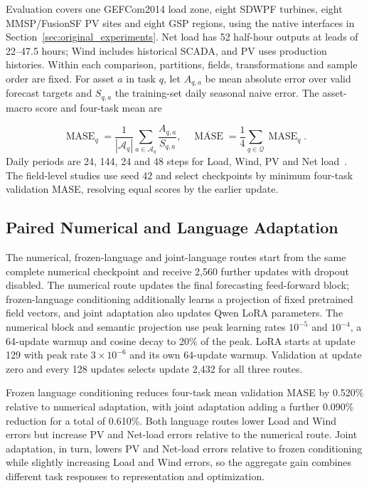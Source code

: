 \documentclass[journal]{IEEEtran}
\begin{document}
Evaluation covers one GEFCom2014 load zone, eight SDWPF turbines, eight MMSP/FusionSF PV sites and eight GSP regions, using the native interfaces in Section~\ref{sec:original_experiments}. Net load has 52 half-hour outputs at leads of 22--47.5 hours; Wind includes historical SCADA, and PV uses production histories. Within each comparison, partitions, fields, transformations and sample order are fixed. For asset $a$ in task $q$, let $A_{q,a}$ be mean absolute error over valid forecast targets and $S_{q,a}$ the training-set daily seasonal naive error. The asset-macro score and four-task mean are


\begin{equation}
\label{eq:language_study_mase}
\operatorname{MASE}_q=\frac{1}{|\mathcal A_q|}\sum_{a\in\mathcal A_q}\frac{A_{q,a}}{S_{q,a}},
\quad
\overline{\operatorname{MASE}}=\frac14\sum_{q\in\mathcal Q}\operatorname{MASE}_q.
\end{equation}
Daily periods are 24, 144, 24 and 48 steps for Load, Wind, PV and Net load~\cite{hyndman2006accuracy}. The field-level studies use seed 42 and select checkpoints by minimum four-task validation MASE, resolving equal scores by the earlier update.

\subsection{Paired Numerical and Language Adaptation}

The numerical, frozen-language and joint-language routes start from the same complete numerical checkpoint and receive 2,560 further updates with dropout disabled. The numerical route updates the final forecasting feed-forward block; frozen-language conditioning additionally learns a projection of fixed pretrained field vectors, and joint adaptation also updates Qwen LoRA parameters. The numerical block and semantic projection use peak learning rates $10^{-5}$ and $10^{-4}$, a 64-update warmup and cosine decay to 20\% of the peak. LoRA starts at update 129 with peak rate $3\times10^{-6}$ and its own 64-update warmup. Validation at update zero and every 128 updates selects update 2,432 for all three routes.

Frozen language conditioning reduces four-task mean validation MASE by 0.520\% relative to numerical adaptation, with joint adaptation adding a further 0.090\% reduction for a total of 0.610\%. Both language routes lower Load and Wind errors but increase PV and Net-load errors relative to the numerical route. Joint adaptation, in turn, lowers PV and Net-load errors relative to frozen conditioning while slightly increasing Load and Wind errors, so the aggregate gain combines different task responses to representation and optimization.
\end{document}
